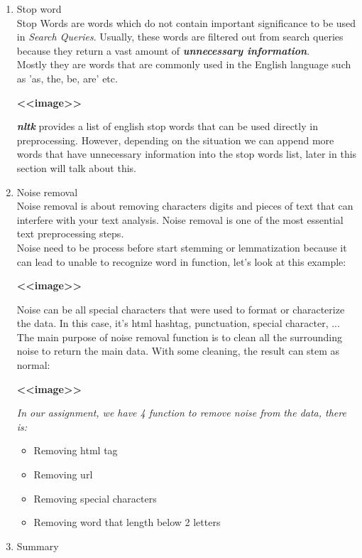 \documentclass{article}
\begin{document}
\begin{enumerate}[label=2.\arabic*]
    \item Stop word \\
    Stop Words are words which do not contain important significance to be used in \emph{Search Queries}. 
    Usually, these words are filtered out from search queries because they return a vast amount of \textbf{\emph{unnecessary information}}. \\
    Mostly they are words that are commonly used in the English language such as 'as, the, be, are' etc.\\
    
    \begin{center}
        \textbf{<<image>>}
    \end{center}

    \textbf{\emph{nltk}} provides a list of english stop words that can be used directly in preprocessing. 
    However, depending on the situation we can append more words that have unnecessary information into the stop words list,
     later in this section will talk about this. \\
    
    \item Noise removal \\
    Noise removal is about removing characters digits and pieces of text that can interfere with your text analysis. Noise removal is one of the most essential text preprocessing steps. \\
    Noise need to be process before start stemming or lemmatization because it can lead to unable to recognize word in function, let’s look at this example:\\

    \begin{center}
        \textbf{<<image>>}
    \end{center}

    Noise can be all special characters that were used to format or characterize the data. In this case, it’s html hashtag, punctuation, special character, ... \\
    The main purpose of noise removal function is to clean all the surrounding noise to return the main data. With some cleaning, the result can stem as normal:\\

    \begin{center}
        \textbf{<<image>>}
    \end{center}

    \emph{In our assignment, we have 4 function to remove noise from the data, there is:}
    \begin{itemize}
        \item Removing html tag
        \item Removing url
        \item Removing special characters
        \item Removing word that length below 2 letters
    \end{itemize}


    \item Summary \\
\end{enumerate}
\end{document}
